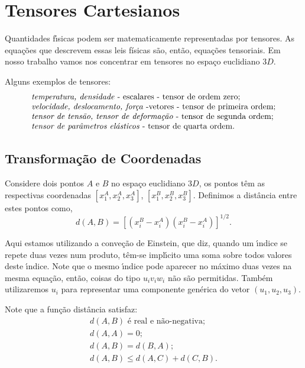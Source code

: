 
\section{Tensores Cartesianos}

Quantidades f\'\i sicas podem ser matematicamente representadas
por tensores. As equa\c{c}\~oes que descrevem essas leis f\'isicas s\~ao, ent\~ao, equa\c{c}\~oes tensoriais.
Em nosso trabalho vamos nos concentrar em tensores no espa\c{c}o
euclidiano $3D$.

Alguns exemplos de tensores: \[  \begin{array}{l}
               \mbox{\emph{temperatura, densidade} - escalares - tensor de ordem zero}; \\
               \mbox{\emph{velocidade, deslocamento, for\c{c}a} -vetores - tensor de primeira ordem}; \\
               \mbox{\emph{tensor de tens\~ao, tensor de deforma\c{c}\~ao} - tensor de segunda ordem}; \\
               \mbox{\emph{tensor de par\^ametros el\'asticos} -  tensor de quarta ordem}. \\

\end{array}  \]

\subsection{Transforma\c{c}\~ao de Coordenadas}

Considere dois pontos $A$ e $B$ no espa\c{c}o euclidiano $3D$, os
pontos t\^em as respectivas coordenadas $[x_{1}^{A}, x_{2}^{A},
x_{3}^{A}]$, $[x_{1}^{B}, x_{2}^{B}, x_{3}^{B}]$. Definimos a
dist\^ancia entre estes pontos como,
\[d(A,B)=\left[(x_{i}^{B}-x_{i}^{A})(x_{i}^{B}-x_{i}^{A})\right]^{1/2}.\]

Aqui estamos utilizando a conve\c{c}\~ao de Einstein, que diz,
quando um \'\i ndice se repete duas vezes num produto, t\^em-se
 impl\'\i cito uma soma sobre todos valores deste \'\i ndice.
 Note que o mesmo \'\i ndice pode aparecer no m\'aximo duas vezes na mesma equa\c{c}\~ao,
 ent\~ao, coisas do tipo $u_{i}v_{i}w_{i}$ n\~ao s\~ao permitidas.
Tamb\'em utilizaremos $u_{i}$ para representar uma componente gen\'erica do vetor $(u_{1},
u_{2}, u_{3})$.

Note que a fun\c{c}\~ao dist\^ancia satisfaz:
\[  \begin{array}{l}
            d(A,B) \mbox{ \'e real e n\~ao-negativa};\\
            d(A,A)=0;\\
             d(A,B)= d(B,A);\\
             d(A,B) \leq d(A,C)+ d(C,B).
\end{array}  \]


